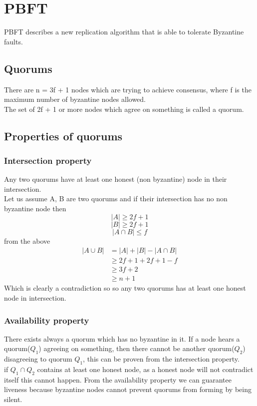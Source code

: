 \documentclass{article}
\begin{document}
\section{PBFT}
PBFT describes a new replication algorithm that is able
to tolerate Byzantine faults.
\subsection{Quorums}
There are n = 3f + 1  nodes which are trying to achieve consensus, where f is the maximum number of byzantine nodes allowed.\\
The set of 2f + 1 or more nodes which agree on something is called a quorum.
\subsection{Properties of quorums}
\subsubsection{Intersection property}
Any two quorums have at least one honest (non byzantine) node in their intersection.\\
Let us assume A, B are two quorums and if their intersection has no non byzantine node then 
$$|A| \geq 2f + 1$$
$$|B| \geq 2f + 1$$
$$|A \cap B| \leq f$$ 
from the above 
\begin{equation}
\begin{split}
|A \cup B| & = |A| + |B| - |A \cap B| \\
 & \geq 2f + 1 + 2f + 1 - f\\
 & \geq 3f + 2\\
 & \geq n + 1
\end{split}
\end{equation}
Which is clearly a contradiction so so any two quorums has at least one honest node in intersection.
\subsubsection{Availability property}
There exists always a quorum which has no byzantine in it.
If a node hears a quorum($Q_1$) agreeing on something, then there cannot be another quorum($Q_2$) disagreeing to quorum $Q_1$, this can be proven from the intersection property. \\
if $Q_1 \cap Q_2$ contains at least one honest node, as a honest node will not contradict itself this cannot happen.
From the availability property we can guarantee liveness because byzantine nodes cannot prevent quorums from forming by being silent.
\end{document}
